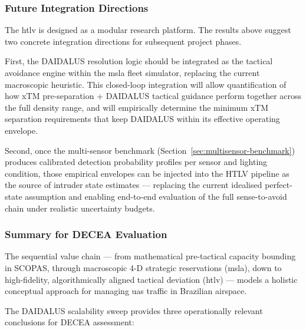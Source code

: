 \subsubsection{Future Integration Directions}

The \gls{htlv} is designed as a modular research platform. The results above suggest two
concrete integration directions for subsequent project phases.

First, the DAIDALUS resolution logic should be integrated as the tactical avoidance engine
within the \gls{msla} fleet simulator, replacing the current macroscopic heuristic. This
closed-loop integration will allow quantification of how xTM pre-separation + DAIDALUS
tactical guidance perform together across the full density range, and will empirically
determine the minimum xTM separation requirements that keep DAIDALUS within its effective
operating envelope.

Second, once the multi-sensor benchmark (Section~\ref{sec:multisensor-benchmark}) produces
calibrated detection probability profiles per sensor and lighting condition, those empirical
envelopes can be injected into the HTLV pipeline as the source of intruder state estimates
--- replacing the current idealised perfect-state assumption and enabling end-to-end
evaluation of the full sense-to-avoid chain under realistic uncertainty budgets.

\subsubsection{Summary for DECEA Evaluation}
\label{subsec:decea_summary}

The sequential value chain --- from mathematical pre-tactical capacity bounding in SCOPAS,
through macroscopic 4-D strategic reservations (\gls{msla}), down to high-fidelity,
algorithmically aligned tactical deviation (\gls{htlv}) --- models a holistic conceptual
approach for managing \gls{uas} traffic in Brazilian airspace.

The DAIDALUS scalability sweep provides three operationally relevant conclusions for DECEA
assessment:

